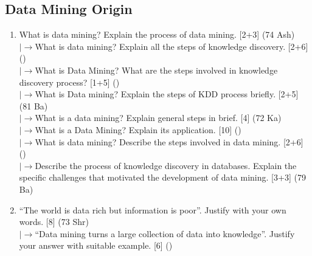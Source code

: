 \documentclass[12pt]{article}
\newcommand{\lb}{\\$\left|\rightarrow\right.$}
\begin{document}
  \subsection{Data Mining Origin}
    \begin{enumerate}[topsep=0pt, noitemsep]
      \item What is data mining? Explain the process of data mining. \hfill [2+3] (74 Ash)
        \lb What is data mining? Explain all the steps of knowledge discovery. \hfill [2+6] ()
        \lb What is Data Mining? What are the steps involved in knowledge discovery process? \hfill [1+5] ()
        \lb What is Data mining? Explain the steps of KDD process briefly. \hfill [2+5] (81 Ba)
        \lb What is a data mining? Explain general steps in brief. \hfill [4] (72 Ka)
        \lb What is a Data Mining? Explain its application. \hfill [10] ()
        \lb What is data mining? Describe the steps involved in data mining. \hfill [2+6] ()
        \lb Describe the process of knowledge discovery in databases. Explain the specific challenges that motivated the development of data mining. \hfill [3+3] (79 Ba)

      \item ``The world is data rich but information is poor''. Justify with your own words. \hfill [8] (73 Shr)
        \lb ``Data mining turns a large collection of data into knowledge''. Justify your answer with suitable example. \hfill [6] ()
    \end{enumerate}
\end{document}
